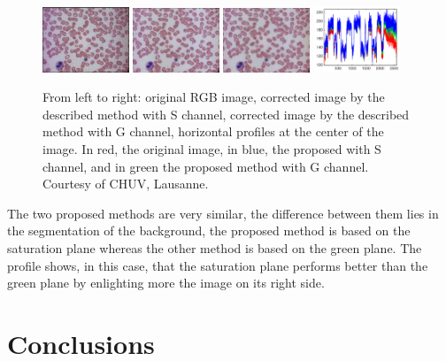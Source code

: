 \documentclass[final,a4paper,12pt,english]{UnicaPhdThesis3}
\begin{document}
{\begin{figure}[h]
	\centering
	\includegraphics[width=0.23\textwidth]{images/homo/homo6}
	\includegraphics[width=0.23\textwidth]{images/homo/homo7}
	\includegraphics[width=0.23\textwidth]{images/homo/homo8}
	\includegraphics[width=0.23\textwidth]{images/homo/homo9}
	\caption{\label{f2_homo} From left to right: original RGB image, corrected image by the described method with S channel, corrected image by the described method with G channel, horizontal profiles at the center of the image. In red, the original image, in blue, the proposed with S channel, and in green the proposed method with G channel. Courtesy of CHUV, Lausanne.}
\end{figure}
The two proposed methods are very similar, the difference between them lies in the segmentation of the background, the proposed method is based on the saturation plane whereas the other method is based on the green plane. The profile shows, in this case, that the saturation plane performs better than the green plane by enlighting more the image on its right side.


\part{Conclusions} 
}
\end{document}
